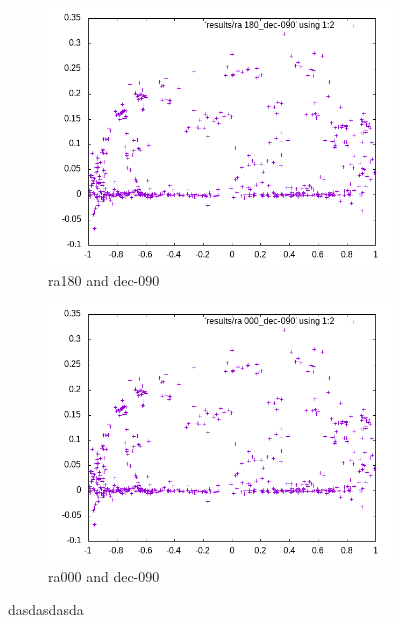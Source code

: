 \begin{figure}[!htb]
	\begin{subfigure}[b]{0.5\textwidth}
		\includegraphics[width=\linewidth]{images/ch4/ra180_dec-090.png}
		\caption{ra180 and dec-090}
	\end{subfigure}
	\hfill
	\begin{subfigure}[b]{0.5\textwidth}
		\includegraphics[width=\linewidth]{images/ch4/ra000_dec-090.png}
		\caption{ra000 and dec-090}
	\end{subfigure}
	\caption{dasdasdasda}
	\label{fig:poles}
\end{figure}

